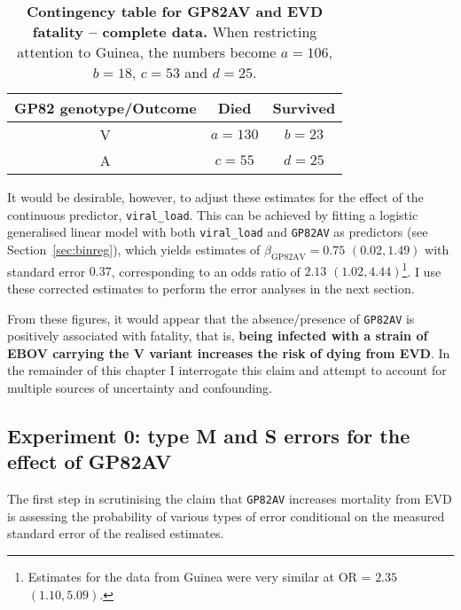 \begin{minipage}{\textwidth}  
\setcounter{mpfootnote}{\value{footnote}}
\renewcommand{\thempfootnote}{\arabic{mpfootnote}}
\fontsize{9}{11}\selectfont
\begin{longtable}{ccc}
\caption[Contingency table for GP82AV and EVD fatality -- complete data.]{\textbf{Contingency table for GP82AV and EVD fatality -- complete data.} When restricting attention to Guinea, the numbers become $a = 106$, $b = 18$, $c = 53$ and $d = 25$.}
\label{tab:rawData}\\
 \hline
GP82 genotype/Outcome & Died & Survived\\ 
  \hline
V & $a = 130$ & $b = 23$ \\ 
A & $c = 55$ & $d = 25$ \\ 
   \hline
\end{longtable}
\setcounter{footnote}{\value{mpfootnote}}
\end{minipage}

It would be desirable, however, to adjust these estimates for the effect of the continuous predictor, \verb|viral_load|.
This can be achieved by fitting a logistic generalised linear model with both \verb|viral_load| and \verb|GP82AV| as predictors (see Section~\ref{sec:binreg}), which yields estimates of $\beta_{\text{GP82AV}} =  0.75$ $(0.02,1.49)$ with standard error $0.37$, corresponding to an odds ratio of $2.13$ $(1.02, 4.44)$\footnote{Estimates for the data from Guinea were very similar at OR = $2.35$ $(1.10, 5.09)$.}.
I use these corrected estimates to perform the error analyses in the next section.

From these figures, it would appear that the absence/presence of \verb|GP82AV| is positively associated with fatality, that is, \textbf{being infected with a strain of EBOV carrying the V variant increases the risk of dying from EVD}. 
In the remainder of this chapter I interrogate this claim and attempt to account for multiple sources of uncertainty and confounding.

\subsection{Experiment 0: type M and S errors for the effect of  GP82AV}
\label{sec:results-MandS}

The first step in scrutinising the claim that \verb|GP82AV| increases mortality from EVD is assessing the probability of various types of error conditional on the measured standard error of the realised estimates.

